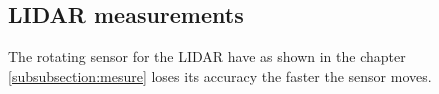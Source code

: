 %
%

\subsection{LIDAR measurements}\label{subsection:lidarmeaurment}
The rotating sensor for the LIDAR have as shown in the chapter \ref{subsubsection:mesure} loses its accuracy the faster the sensor moves. 

